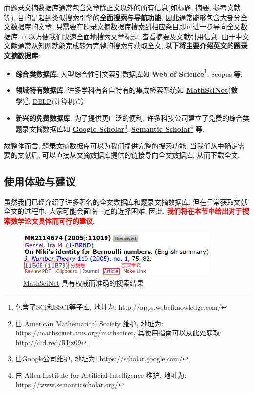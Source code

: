 \documentclass{formatBook}
\newcommand{\XG}[1]{\textcolor{red}{#1}}
\begin{document}
而题录文摘数据库通常包含文章除正文以外的所有信息(如标题, 摘要, 参考文献等), 目的是起到类似搜索引擎的\textbf{全面搜索与导航功能}, 因此通常能够包含大部分全文数据库的文章, 只需要在题录文摘数据库搜索到相应条目即可进一步导向全文数据库. 可以方便我们快速全面地搜索文章标题, 查看摘要及文献引用信息. 由于中文文献通常从知网就能完成较为完整的搜索与获取全文, \textbf{以下将主要介绍英文的题录文摘数据库}:
\begin{itemize}
    \item \textbf{综合类数据库}: 大型综合性引文索引数据库如 \textbf{\href{http://apps.webofknowledge.com/}{Web of Science}}\footnote{包含了SCI和SSCI等子库, 地址为: \url{http://apps.webofknowledge.com/}}, \href{https://www.scopus.com/}{Scopus} 等;
    \item \textbf{领域特有数据库}: 许多学科有各自特有的集成检索系统如 \textbf{\href{https://mathscinet.ams.org/mathscinet}{MathSciNet}(数学)}\footnote{由 American Mathematical Society 维护, 地址为: \url{https://mathscinet.ams.org/mathscinet}, 其使用指南可以从此处获取: \url{http://did.red/RIjz09}}, \href{https://dblp.uni-trier.de/}{DBLP}(计算机)等;
    \item \textbf{新兴的免费数据库}: 为了提供更广泛的便利, 许多科技公司建立了免费的综合类题录文摘数据库如 \textbf{\href{https://scholar.google.com/}{Google Scholar}}\footnote{由Google公司维护, 地址为: \url{https://scholar.google.com/}}, \textbf{\href{https://www.semanticscholar.org/}{Semantic Scholar}}\footnote{由 Allen Institute for Artificial Intelligence 维护, 地址为: \url{https://www.semanticscholar.org/}} 等.
\end{itemize}

故整体而言, 题录文摘数据库可以为我们提供完整的搜索功能, 当我们从中确定需要的文献后, 可以直接从文摘数据库提供的链接导向全文数据库, 从而下载全文.

\subsection{使用体验与建议}
虽然我们已经介绍了许多著名的全文数据库和题录文摘数据库, 但在日常获取文献全文的过程中, 大家可能会面临一定的选择困难. 因此, \XG{\textbf{我们将在本节中给出对于搜索数学论文具体而可行的建议}}.
\begin{figure}[htbp]
    \centering
    \includegraphics[width=0.9\textwidth]{figure/mathscinet.png}
    \caption{\href{https://mathscinet.ams.org/mathscinet}{MathSciNet} 具有权威而准确的搜索结果}
    \label{fig:mathscinet}
\end{figure}
\end{document}
